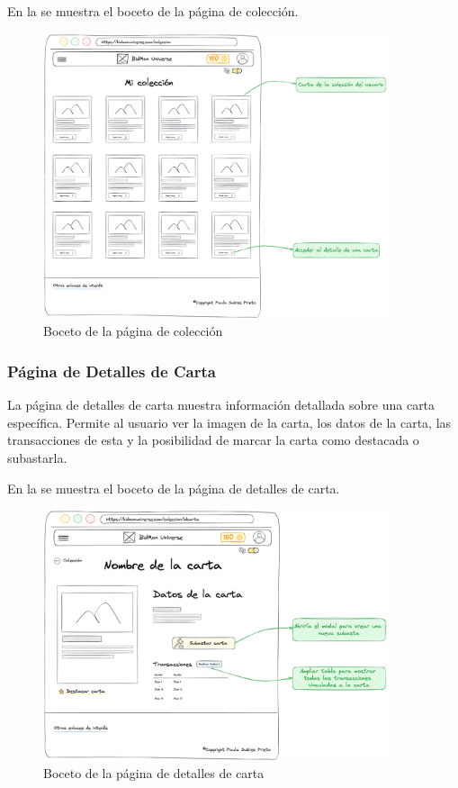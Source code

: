 En la  se muestra el boceto de la página de colección.
\begin{figure}[H]
    \centering
    \includegraphics[width=0.9\textwidth]{figures/6-Analisis/6-Interfaz/prototipos/coleccion.png}
    \caption{Boceto de la página de colección}
    \label{fig:p_collection}
    \hypertarget{fig:p_collection}{}
\end{figure}

\subsubsection{Página de Detalles de Carta}
La página de detalles de carta muestra información detallada sobre una carta específica. Permite al usuario ver la imagen de la carta, los datos de la carta, 
las transacciones de esta y la posibilidad de marcar la carta como destacada o subastarla.

En la  se muestra el boceto de la página de detalles de carta.
\begin{figure}[H]
    \centering
    \includegraphics[width=0.9\textwidth]{figures/6-Analisis/6-Interfaz/prototipos/detalle-carta.png}
    \caption{Boceto de la página de detalles de carta}
    \label{fig:p_card_details}
    \hypertarget{fig:p_card_details}{}
\end{figure}

